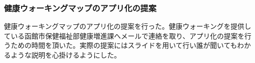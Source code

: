 ﻿\subsubsection{健康ウォーキングマップのアプリ化の提案}
健康ウォーキングマップのアプリ化の提案を行った。健康ウォーキングを提供している函館市保健福祉部健康増進課へメールで連絡を取り、アプリ化の提案を行うための時間を頂いた。実際の提案にはスライドを用いて行い誰が聞いてもわかるような説明を心掛けるようにした。
